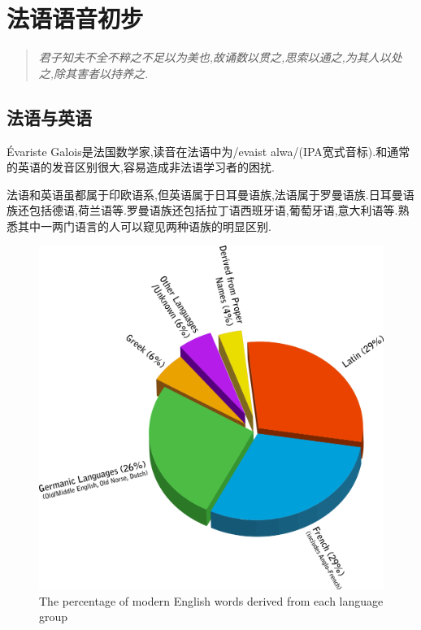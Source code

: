 \chapter{法语语音初步}
\begin{quotation}
	\textit{君子知夫不全不粹之不足以为美也,故诵数以贯之,思索以通之,为其人以处之,除其害者以持养之.}
\end{quotation}

\section{法语与英语}
Évariste Galois是法国数学家,读音在法语中为/eva\textinvscr ist \textscriptg alwa/(IPA宽式音标).和通常的英语的发音区别很大,容易造成非法语学习者的困扰.

法语和英语虽都属于印欧语系,但英语属于日耳曼语族,法语属于罗曼语族.日耳曼语族还包括德语,荷兰语等.罗曼语族还包括拉丁语西班牙语,葡萄牙语,意大利语等.熟悉其中一两门语言的人可以窥见两种语族的明显区别.
\begin{figure}[htp]
	\centering
	\includegraphics[scale=0.27]{Origins}
	\caption{The percentage of modern English words derived from each language group}
\end{figure}


